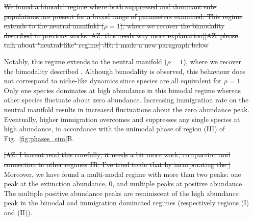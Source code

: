 \documentclass[9pt,twocolumn,twoside,lineno]{pnas-new}
\begin{document}
\st{We found a bimodal regime where both suppressed and dominant sub-populations are present for a broad range of parameters examined. 
This regime extends to the neutral manifold ($\rho = 1$), where we recover the bimodality described in previous works %
[AZ: this needs way more explanation][AZ: please talk about "neutral-like" regime] JR: I made a new paragraph below}

Notably, this regime extends to the neutral manifold ($\rho = 1$), where we recover the bimodality described \cite{xu2018immigration}.
Although bimodality is observed, this behaviour does not correspond to niche-like dynamics since species are all equivalent for $\rho = 1$.
Only one species dominates at high abundance in this bimodal regime whereas other species fluctuate about zero abundance.
Increasing immigration rate on the neutral manifold results in increased fluctuations about the zero abundance peak.
Eventually, higher immigration overcomes and suppresses any single species at high abundance, in accordance with the unimodal phase of region (III) of Fig.~\ref{fig:phases_sim}B.

\st{[AZ: I havent read this carefully; it needs a bit more work, compaction and connection to other regimes JR: I've tried to do that by incorporating the ]}
Moreover, we have found a multi-modal regime with more than two peaks: one peak at the extinction abundance, 0, and multiple peaks at positive abundance. 
The multiple positive abundance peaks are reminiscent of the high abundance peak in the bimodal and immigration dominated regimes (respectively regions (I) and (II)).
\end{document}

